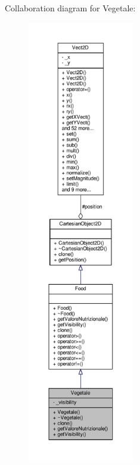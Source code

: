Collaboration diagram for Vegetale\+:\nopagebreak
\begin{figure}[H]
\begin{center}
\leavevmode
\includegraphics[height=550pt]{classVegetale__coll__graph}
\end{center}
\end{figure}
